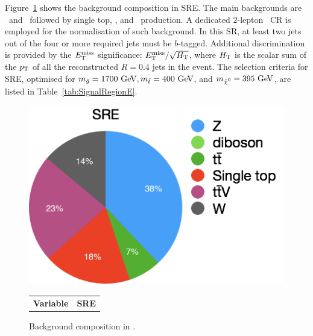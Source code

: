 				Figure~\ref{fig:SRE_bkgcomp} shows the background composition in SRE. The main backgrounds are \Zjets\ and \ttV\ followed by single top, \Wjets, and \ttbar\ production. A dedicated $2$-lepton \Zjets\ \ac{CR} is employed for the normalisation of such background.  In this \ac{SR}, at least two jets out of the four or more required jets must be $b$-tagged. Additional discrimination is provided by the $E_{\mathrm{T}}^{\mathrm{miss}}$ significance: $E_{\mathrm{T}}^{\mathrm{miss}}/\sqrt{H_{\mathrm{T}}}$, where $H_{\mathrm{T}}$ is the scalar sum of the $p_{\mathrm{T}}$ of all the reconstructed $R=0.4$ jets in the event. The selection criteria for SRE, optimised for $m_{\gluino} = 1700 \GeV, \mstop=400\GeV$, and $\mLSP=395\GeV$, are listed in Table~\ref{tab:SignalRegionE}.

				\begin{figure}[!htb]
					\centering
					\begin{minipage}[]{.5\textwidth}
						\centering
						\vspace{0pt}
						\includegraphics[width=\textwidth]{figures/stop/piechart_SREcomp}
						\caption{Background composition in \SRE.}
						\label{fig:SRE_bkgcomp}
					\end{minipage}\hfill
					\begin{minipage}[!htb]{.5\textwidth}
						\centering
						\vspace{0pt}
						\def\arraystretch{1.4}
							\begin{tabular}{lc}\toprule
							   {\textbf{Variable}}    & {\textbf{SRE}}\\

\end{tabular}
\end{minipage}
\end{figure}
